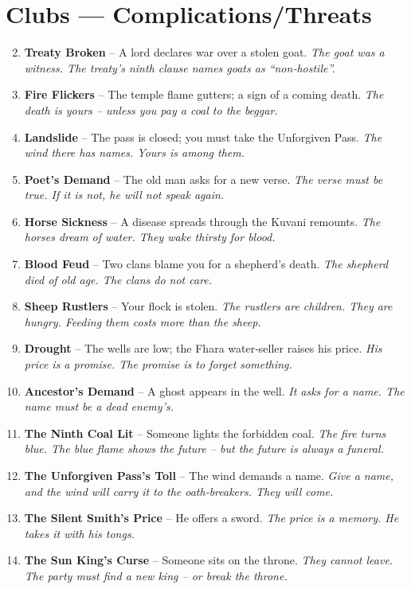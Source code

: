 \documentclass[11pt]{book}
\begin{document}
\section*{Clubs — Complications/Threats}
\begin{enumerate}
\setcounter{enumi}{1}
\item \textbf{Treaty Broken} – A lord declares war over a stolen goat. \textit{The goat was a witness. The treaty’s ninth clause names goats as “non‑hostile”.}
\item \textbf{Fire Flickers} – The temple flame gutters; a sign of a coming death. \textit{The death is yours – unless you pay a coal to the beggar.}
\item \textbf{Landslide} – The pass is closed; you must take the Unforgiven Pass. \textit{The wind there has names. Yours is among them.}
\item \textbf{Poet’s Demand} – The old man asks for a new verse. \textit{The verse must be true. If it is not, he will not speak again.}
\item \textbf{Horse Sickness} – A disease spreads through the Kuvani remounts. \textit{The horses dream of water. They wake thirsty for blood.}
\item \textbf{Blood Feud} – Two clans blame you for a shepherd’s death. \textit{The shepherd died of old age. The clans do not care.}
\item \textbf{Sheep Rustlers} – Your flock is stolen. \textit{The rustlers are children. They are hungry. Feeding them costs more than the sheep.}
\item \textbf{Drought} – The wells are low; the Fhara water‑seller raises his price. \textit{His price is a promise. The promise is to forget something.}
\item \textbf{Ancestor’s Demand} – A ghost appears in the well. \textit{It asks for a name. The name must be a dead enemy’s.}
\item[J] \textbf{The Ninth Coal Lit} – Someone lights the forbidden coal. \textit{The fire turns blue. The blue flame shows the future – but the future is always a funeral.}
\item[Q] \textbf{The Unforgiven Pass’s Toll} – The wind demands a name. \textit{Give a name, and the wind will carry it to the oath‑breakers. They will come.}
\item[K] \textbf{The Silent Smith’s Price} – He offers a sword. \textit{The price is a memory. He takes it with his tongs.}
\item[A] \textbf{The Sun King’s Curse} – Someone sits on the throne. \textit{They cannot leave. The party must find a new king – or break the throne.}
\end{enumerate}
\end{document}
